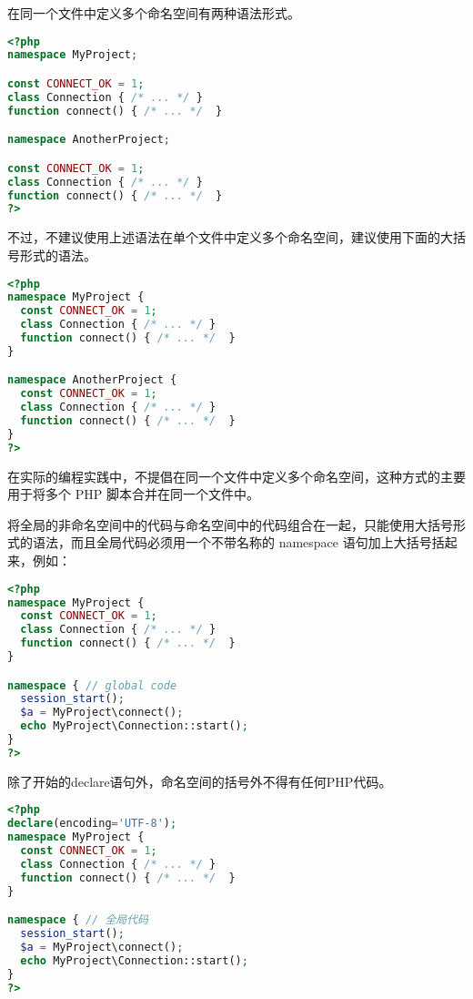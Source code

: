 在同一个文件中定义多个命名空间有两种语法形式。

\begin{lstlisting}[language=PHP]
<?php
namespace MyProject;

const CONNECT_OK = 1;
class Connection { /* ... */ }
function connect() { /* ... */  }

namespace AnotherProject;

const CONNECT_OK = 1;
class Connection { /* ... */ }
function connect() { /* ... */  }
?>
\end{lstlisting}

不过，不建议使用上述语法在单个文件中定义多个命名空间，建议使用下面的大括号形式的语法。


\begin{lstlisting}[language=PHP]
<?php
namespace MyProject {
  const CONNECT_OK = 1;
  class Connection { /* ... */ }
  function connect() { /* ... */  }
}

namespace AnotherProject {
  const CONNECT_OK = 1;
  class Connection { /* ... */ }
  function connect() { /* ... */  }
}
?>
\end{lstlisting}

在实际的编程实践中，不提倡在同一个文件中定义多个命名空间，这种方式的主要用于将多个 PHP 脚本合并在同一个文件中。

将全局的非命名空间中的代码与命名空间中的代码组合在一起，只能使用大括号形式的语法，而且全局代码必须用一个不带名称的 namespace 语句加上大括号括起来，例如：


\begin{lstlisting}[language=PHP]
<?php
namespace MyProject {
  const CONNECT_OK = 1;
  class Connection { /* ... */ }
  function connect() { /* ... */  }
}

namespace { // global code
  session_start();
  $a = MyProject\connect();
  echo MyProject\Connection::start();
}
?>
\end{lstlisting}

除了开始的declare语句外，命名空间的括号外不得有任何PHP代码。


\begin{lstlisting}[language=PHP]
<?php
declare(encoding='UTF-8');
namespace MyProject {
  const CONNECT_OK = 1;
  class Connection { /* ... */ }
  function connect() { /* ... */  }
}

namespace { // 全局代码
  session_start();
  $a = MyProject\connect();
  echo MyProject\Connection::start();
}
?>
\end{lstlisting}







